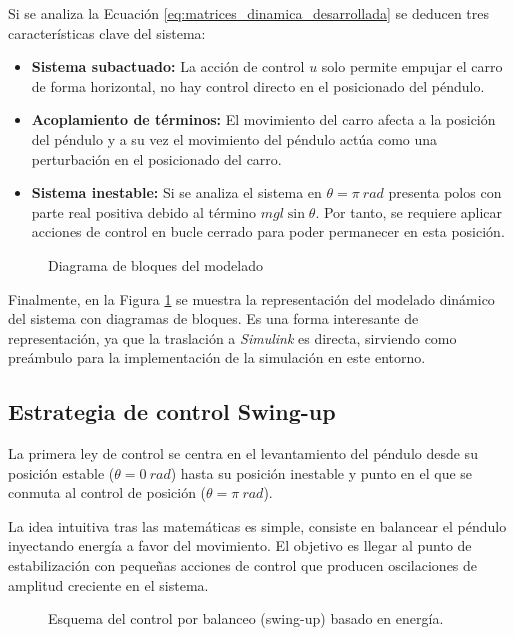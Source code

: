 \documentclass[11pt,fleqn]{book} %
\begin{document}
Si se analiza la Ecuación \ref{eq:matrices_dinamica_desarrollada} se deducen tres características clave del sistema: 
\begin{itemize}[]
	\item \textbf{Sistema subactuado:} La acción de control $u$ solo permite empujar el carro de forma horizontal, no hay control directo en el posicionado del péndulo. 
	
	\item \textbf{Acoplamiento de términos:} El movimiento del carro afecta a la posición del péndulo y a su vez el movimiento del péndulo actúa como una perturbación en el posicionado del carro. 
	
	\item \textbf{Sistema inestable:} Si se analiza el sistema en $\theta = \pi\ rad$ presenta polos con parte real positiva debido al término $	m g l \sin\theta $. Por tanto, se requiere aplicar acciones de control en bucle cerrado para poder permanecer en esta posición. 
	
\end{itemize}

 \begin{figure}[htpb]
	\centering
	\resizebox{\textwidth}{!}{%
		
	}
	
	\caption{Diagrama de bloques del modelado}
	\label{fig:bloques_modelado}
\end{figure}

\FloatBarrier

Finalmente, en la Figura \ref{fig:bloques_modelado} se muestra la representación del modelado dinámico del sistema con diagramas de bloques. Es una forma interesante de representación, ya que la traslación a \textit{Simulink} es directa, sirviendo como preámbulo para la implementación de la simulación en este entorno.


\newpage
\subsection{Estrategia de control Swing-up}
\label{cap:swing_up}
La primera ley de control se centra en el levantamiento del péndulo desde su posición estable ($\theta = 0\ rad$) hasta su posición inestable y punto en el que se conmuta al control de posición ($\theta = \pi\ rad$). 

La idea intuitiva tras las matemáticas es simple, consiste en balancear el péndulo inyectando energía a favor del movimiento. El objetivo es llegar al punto de estabilización con pequeñas acciones de control que producen oscilaciones de amplitud creciente en el sistema. 
\begin{figure}[ht]
	\centering
	
	\caption{Esquema del control por balanceo (swing-up) basado en energía.}
	\label{fig:swing_up_simple}
\end{figure}
\end{document}
